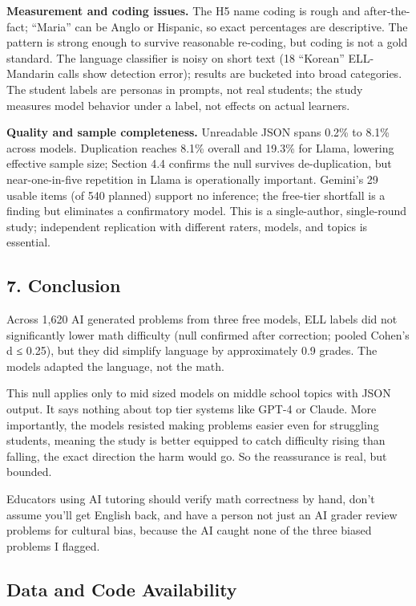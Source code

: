 \documentclass[
]{article}
\let\oldtexttt\texttt
\renewcommand{\texttt}[1]{\oldtexttt{\seqsplit{#1}}}
\begin{document}
\textbf{Measurement and coding issues.} The H5 name coding is rough and
after-the-fact; ``Maria'' can be Anglo or Hispanic, so exact percentages
are descriptive. The pattern is strong enough to survive reasonable
re-coding, but coding is not a gold standard. The \texttt{langdetect}
language classifier is noisy on short text (18 ``Korean'' ELL-Mandarin
calls show detection error); results are bucketed into broad categories.
The student labels are personas in prompts, not real students; the study
measures model behavior under a label, not effects on actual learners.

\textbf{Quality and sample completeness.} Unreadable JSON spans 0.2\% to
8.1\% across models. Duplication reaches 8.1\% overall and 19.3\% for
Llama, lowering effective sample size; Section 4.4 confirms the null
survives de-duplication, but near-one-in-five repetition in Llama is
operationally important. Gemini's 29 usable items (of 540 planned)
support no inference; the free-tier shortfall is a finding but
eliminates a confirmatory model. This is a single-author, single-round
study; independent replication with different raters, models, and topics
is essential.

\hypertarget{conclusion}{%
\subsection{7. Conclusion}\label{conclusion}}

Across 1,620 AI generated problems from three free models, ELL labels
did not significantly lower math difficulty (null confirmed after
correction; pooled Cohen's d ≤ 0.25), but they did simplify language by
approximately 0.9 grades. The models adapted the language, not the math.

This null applies only to mid sized models on middle school topics with
JSON output. It says nothing about top tier systems like GPT-4 or
Claude. More importantly, the models resisted making problems easier
even for struggling students, meaning the study is better equipped to
catch difficulty rising than falling, the exact direction the harm would
go. So the reassurance is real, but bounded.

Educators using AI tutoring should verify math correctness by hand,
don't assume you'll get English back, and have a person not just an AI
grader review problems for cultural bias, because the AI caught none of
the three biased problems I flagged.

\hypertarget{data-and-code-availability}{%
\subsection{Data and Code
Availability}\label{data-and-code-availability}}
\end{document}
